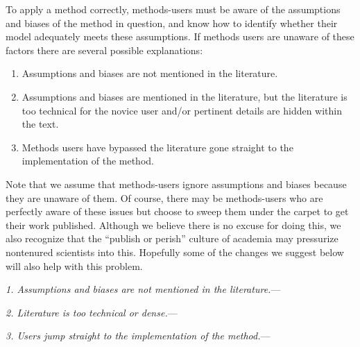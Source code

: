 \documentclass[a4paper,12pt]{article}
\renewcommand{\subsubsection}[1]{%
\vspace{2ex}
\noindent
\textit{#1.}---}
\begin{document}
To apply a method correctly, methods-users must be aware of the assumptions and biases of the method in question, and know how to identify whether their model adequately meets these assumptions. If methods users are unaware of these factors there are several possible explanations:

\begin{enumerate}
\item Assumptions and biases are not mentioned in the literature.
\item Assumptions and biases are mentioned in the literature, but the literature is too technical for the novice user and/or pertinent details are hidden within the text.
\item Methods users have bypassed the literature gone straight to the implementation of the method.
\end{enumerate}

Note that we assume that methods-users ignore assumptions and biases because they are unaware of them. Of course, there may be methods-users who are perfectly aware of these issues but choose to sweep them under the carpet to get their work published. Although we believe there is no excuse for doing this, we also recognize that the ``publish or perish'' culture of academia may pressurize nontenured scientists into this. Hopefully some of the changes we suggest below will also help with this problem.

\subsubsection{1. Assumptions and biases are not mentioned in the literature}

\subsubsection{2. Literature is too technical or dense}

\subsubsection{3. Users jump straight to the implementation of the method}

\end{document}
